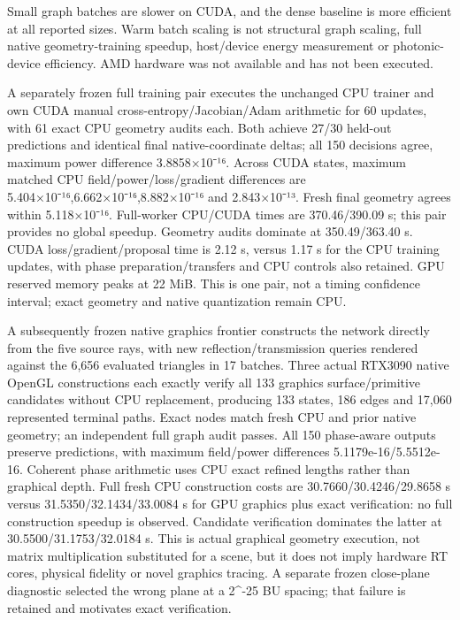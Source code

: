 \documentclass[
  10pt,
]{article}
\begin{document}
Small graph batches are slower on CUDA, and the dense baseline is more
efficient at all reported sizes. Warm batch scaling is not structural
graph scaling, full native geometry-training speedup, host/device energy
measurement or photonic-device efficiency. AMD hardware was not
available and has not been executed.

A separately frozen full training pair executes the unchanged CPU
trainer and own CUDA manual cross-entropy/Jacobian/Adam arithmetic for
60 updates, with 61 exact CPU geometry audits each. Both achieve 27/30
held-out predictions and identical final native-coordinate deltas; all
150 decisions agree, maximum power difference 3.8858×10⁻¹⁶. Across CUDA
states, maximum matched CPU field/power/loss/gradient differences are
5.404×10⁻¹⁶,6.662×10⁻¹⁶,8.882×10⁻¹⁶ and 2.843×10⁻¹³. Fresh final
geometry agrees within 5.118×10⁻¹⁶. Full-worker CPU/CUDA times are
370.46/390.09 s; this pair provides no global speedup. Geometry audits
dominate at 350.49/363.40 s. CUDA loss/gradient/proposal time is 2.12 s,
versus 1.17 s for the CPU training updates, with phase
preparation/transfers and CPU controls also retained. GPU reserved
memory peaks at 22 MiB. This is one pair, not a timing confidence
interval; exact geometry and native quantization remain CPU.

A subsequently frozen native graphics frontier constructs the network
directly from the five source rays, with new reflection/transmission
queries rendered against the 6,656 evaluated triangles in 17 batches.
Three actual RTX3090 native OpenGL constructions each exactly verify all
133 graphics surface/primitive candidates without CPU replacement,
producing 133 states, 186 edges and 17,060 represented terminal paths.
Exact nodes match fresh CPU and prior native geometry; an independent
full graph audit passes. All 150 phase-aware outputs preserve
predictions, with maximum field/power differences 5.1179e-16/5.5512e-16.
Coherent phase arithmetic uses CPU exact refined lengths rather than
graphical depth. Full fresh CPU construction costs are
30.7660/30.4246/29.8658 s versus 31.5350/32.1434/33.0084 s for GPU
graphics plus exact verification: no full construction speedup is
observed. Candidate verification dominates the latter at
30.5500/31.1753/32.0184 s. This is actual graphical geometry execution,
not matrix multiplication substituted for a scene, but it does not imply
hardware RT cores, physical fidelity or novel graphics tracing. A
separate frozen close-plane diagnostic selected the wrong plane at a
2\^{}-25 BU spacing; that failure is retained and motivates exact
verification.
\end{document}
